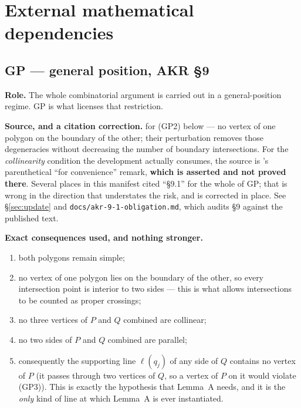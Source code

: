 \documentclass[11pt,a4paper]{article}
\theoremstyle{plain}
\theoremstyle{definition}
\theoremstyle{remark}
\begin{document}
\section{External mathematical dependencies}

\subsection{\texorpdfstring{\textsf{GP} --- general position, AKR \S9}{GP -- general position, AKR S9}}\label{sec:gp}

\textbf{Role.} The whole combinatorial argument is carried out in a
general-position regime. \textsf{GP} is what licenses that restriction.

\textbf{Source, and a citation correction.} \cite[\S9]{AckermanKeszeghRote2022}
for (GP2) below --- no vertex of one polygon on the boundary of the other; their
perturbation removes those degeneracies without decreasing the number of
boundary intersections. For the \emph{collinearity} condition the development
actually consumes, the source is \cite[\S3]{AckermanKeszeghRote2022}'s
parenthetical ``for convenience'' remark, \textbf{which is asserted and not
proved there}. Several places in this manifest cited ``\S9.1'' for the whole of
\textsf{GP}; that is wrong in the direction that understates the risk, and is
corrected in place. See \S\ref{sec:update} and
\texttt{docs/akr-9-1-obligation.md}, which audits \S9 against the published
text.

\textbf{Exact consequences used, and nothing stronger.}
\begin{enumerate}[label=(GP\arabic*),leftmargin=*]
  \item both polygons remain simple;
  \item no vertex of one polygon lies on the boundary of the other, so every
    intersection point is interior to two sides --- this is what allows
    intersections to be counted as proper crossings;
  \item no three vertices of $P$ and $Q$ combined are collinear;
  \item no two sides of $P$ and $Q$ combined are parallel;
  \item consequently the supporting line $\ell(q_j)$ of any side of $Q$ contains
    no vertex of $P$ (it passes through two vertices of $Q$, so a vertex of $P$
    on it would violate (GP3)). This is exactly the hypothesis that
    Lemma~A needs, and it is the \emph{only} kind of line at which Lemma~A is
    ever instantiated.
\end{enumerate}
\end{document}
